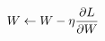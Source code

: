 \documentclass[preview]{standalone}
\begin{document}
\begin{align*}
\special{dvisvgm:raw <g id='unique000'>}W \leftarrow W - \eta \frac{\partial L}{\partial W}\special{dvisvgm:raw </g>}
\end{align*}
\end{document}

